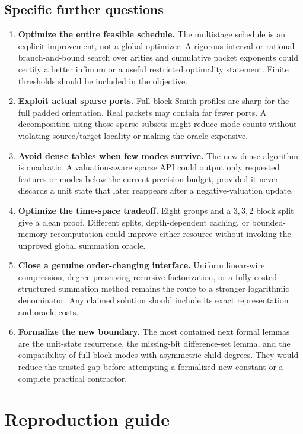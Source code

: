\documentclass[11pt,letterpaper]{article}
\theoremstyle{definition}\newtheorem{definition}[theorem]{Definition}
\theoremstyle{remark}\newtheorem{remark}[theorem]{Remark}
\begin{document}
\subsection{Specific further questions}

\begin{enumerate}
\item \textbf{Optimize the entire feasible schedule.} The multistage
schedule is an explicit improvement, not a global optimizer. A rigorous
interval or rational branch-and-bound search over arities and cumulative
packet exponents could certify a better infimum or a useful restricted
optimality statement. Finite thresholds should be included in the objective.
\item \textbf{Exploit actual sparse ports.} Full-block Smith profiles are
sharp for the full padded orientation. Real packets may contain far fewer
ports. A decomposition using those sparse subsets might reduce mode counts
without violating source/target locality or making the oracle expensive.
\item \textbf{Avoid dense tables when few modes survive.} The new dense
algorithm is quadratic. A valuation-aware sparse API could output only
requested features or modes below the current precision budget, provided
it never discards a unit state that later reappears after a negative-valuation
update.
\item \textbf{Optimize the time-space tradeoff.} Eight groups and a
$3,3,2$ block split give a clean proof. Different splits, depth-dependent
caching, or bounded-memory recomputation could improve either resource
without invoking the unproved global summation oracle.
\item \textbf{Close a genuine order-changing interface.} Uniform
linear-wire compression, degree-preserving recursive factorization, or a
fully costed structured summation method remains the route to a stronger
logarithmic denominator. Any claimed solution should include its exact
representation and oracle costs.
\item \textbf{Formalize the new boundary.} The most contained next formal
lemmas are the unit-state recurrence, the missing-bit difference-set lemma,
and the compatibility of full-block modes with asymmetric child degrees.
They would reduce the trusted gap before attempting a formalized new
constant or a complete practical contractor.
\end{enumerate}

\section*{Reproduction guide}
\end{document}
